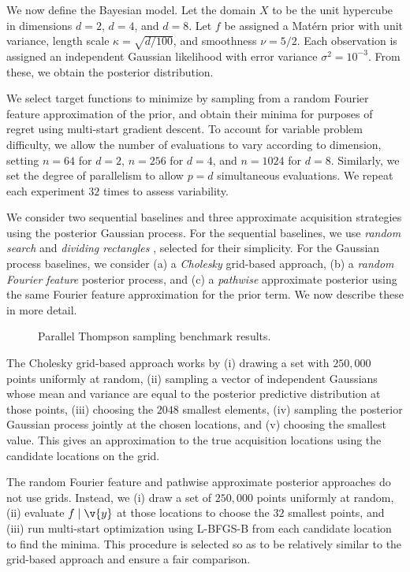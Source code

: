 \documentclass[11pt]{book}
\begin{document}
We now define the Bayesian model.
Let the domain $X$ to be the unit hypercube in dimensions $d = 2$, $d = 4$, and $d = 8$.
Let $f$ be assigned a Matérn prior with unit variance, length scale $\kappa = \sqrt{d/100}$, and smoothness $\nu = 5/2$.
Each observation is assigned an independent Gaussian likelihood with error variance $\sigma^2 = 10^{-3}$.
From these, we obtain the posterior distribution.

We select target functions to minimize by sampling from a random Fourier feature approximation of the prior, and obtain their minima for purposes of regret using multi-start gradient descent.
To account for variable problem difficulty, we allow the number of evaluations to vary according to dimension, setting $n=64$ for $d=2$, $n = 256$ for $d = 4$, and $n = 1024$ for $d = 8$.
Similarly, we set the degree of parallelism to allow $p = d$ simultaneous evaluations.
We repeat each experiment $32$ times to assess variability.

We consider two sequential baselines and three approximate acquisition strategies using the posterior Gaussian process.
For the sequential baselines, we use \emph{random search} \cite{bergstra12} and \emph{dividing rectangles} \cite{jones93}, selected for their simplicity.
For the Gaussian process baselines, we consider (a) a \emph{Cholesky} grid-based approach, (b) a \emph{random Fourier feature} posterior process, and (c) a \emph{pathwise} approximate posterior using the same Fourier feature approximation for the prior term.
We now describe these in more detail.

\begin{figure*}[p!]

\caption[Parallel Thompson sampling benchmark results]{Parallel Thompson sampling benchmark results.}
\label{fig:parallel-ts}
\end{figure*}

The Cholesky grid-based approach works by (i) drawing a set with $250,000$ points uniformly at random, (ii) sampling a vector of independent Gaussians whose mean and variance are equal to the posterior predictive distribution at those points, (iii) choosing the $2048$ smallest elements, (iv) sampling the posterior Gaussian process jointly at the chosen locations, and (v) choosing the smallest value.
This gives an approximation to the true acquisition locations using the candidate locations on the grid.

The random Fourier feature and pathwise approximate posterior approaches do not use grids.
Instead, we (i) draw a set of $250,000$ points uniformly at random, (ii) evaluate $f \given \v{y}$ at those locations to choose the $32$ smallest points, and (iii) run multi-start optimization using L-BFGS-B \cite{byrd95} from each candidate location to find the minima.
This procedure is selected so as to be relatively similar to the grid-based approach and ensure a fair comparison.
\end{document}
